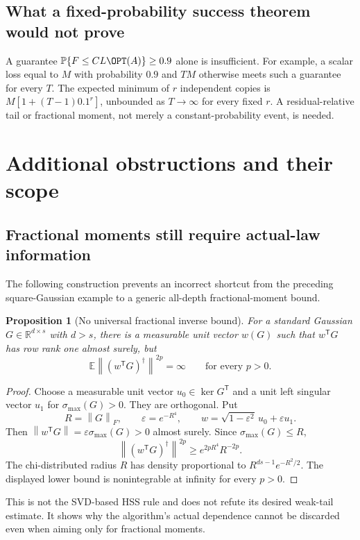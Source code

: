 \documentclass[11pt,oneside,openany,a4paper]{book}
\numberwithin{equation}{chapter}
\newtheorem{proposition}[theorem]{Proposition}
\theoremstyle{definition}
\theoremstyle{remark}
\newcommand{\R}{\mathbb R}\newcommand{\E}{\mathbb E}\newcommand{\Prb}{\mathbb P}\newcommand{\PP}{\mathbb P}
\newcommand{\T}{\mathsf T}\newcommand{\Id}{I}
\newcommand{\F}[1]{\left\lVert#1\right\rVert_F}
\newcommand{\N}[1]{\left\lVert#1\right\rVert}
\begin{document}
\subsection{What a fixed-probability success theorem would not prove}
A guarantee $\Prb\{F\le CL\OPT(A)\}\ge0.9$ alone is insufficient.
For example, a scalar loss equal to $M$ with probability $0.9$ and $TM$
otherwise meets such a guarantee for every $T$. The expected minimum of
$r$ independent copies is $M[1+(T-1)0.1^r]$, unbounded as $T\to\infty$
for every fixed $r$. A residual-relative tail or fractional moment, not
merely a constant-probability event, is needed.

\section{Additional obstructions and their scope}\label{base:sec:additional-obstructions}
\subsection{Fractional moments still require actual-law information}
The following construction prevents an incorrect shortcut from the preceding
square-Gaussian example to a generic all-depth fractional-moment bound.

\begin{proposition}[No universal fractional inverse bound]\label{base:aug:prop:all-fractional}
For a standard Gaussian $G\in\R^{d\times s}$ with $d>s$, there is a
measurable unit vector $w(G)$ such that $w^{\T}G$ has row rank one almost
surely, but
\[
 \E\N{(w^{\T}G)^\dagger}^{2p}=\infty
 \qquad\text{for every }p>0.
\]
\end{proposition}
\begin{proof}
Choose a measurable unit vector $u_0\in\ker G^{\T}$ and a unit left
singular vector $u_1$ for $\sigma_{\max}(G)>0$. They are orthogonal. Put
\[
 R=\F G,\qquad \varepsilon=e^{-R^4},\qquad
 w=\sqrt{1-\varepsilon^2}\,u_0+\varepsilon u_1.
\]
Then $\N{w^{\T}G}=\varepsilon\sigma_{\max}(G)>0$ almost surely. Since
$\sigma_{\max}(G)\le R$,
\[
 \N{(w^{\T}G)^\dagger}^{2p}
 \ge e^{2pR^4}R^{-2p}.
\]
The chi-distributed radius $R$ has density proportional to
$R^{ds-1}e^{-R^2/2}$. The displayed lower bound is nonintegrable at
infinity for every $p>0$.
\end{proof}

This is not the SVD-based HSS rule and does not refute its desired
weak-tail estimate. It shows why the algorithm's actual dependence cannot
be discarded even when aiming only for fractional moments.
\end{document}
